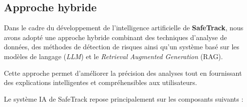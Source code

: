 \subsection{Approche hybride}

Dans le cadre du développement de l’intelligence artificielle de \textbf{SafeTrack}, nous avons adopté une approche hybride combinant des techniques d’analyse de données, des méthodes de détection de risques ainsi qu’un système basé sur les modèles de langage (\textit{LLM}) et le \textit{Retrieval Augmented Generation} (RAG).

Cette approche permet d’améliorer la précision des analyses tout en fournissant des explications intelligentes et compréhensibles aux utilisateurs.

Le système IA de SafeTrack repose principalement sur les composants suivants :

